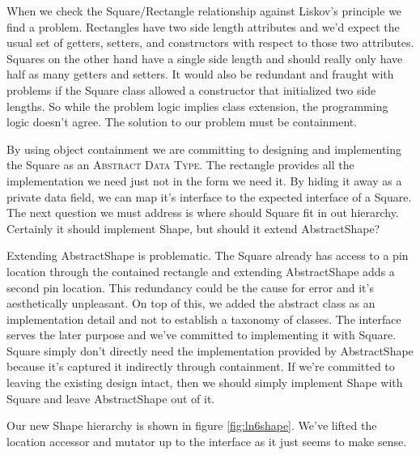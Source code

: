 \documentclass[]{tufte-handout}
\begin{document}
When we check the Square/Rectangle relationship against Liskov's principle we find a problem. Rectangles have two side length attributes and we'd expect the usual set of getters, setters, and constructors with respect to those two attributes. Squares on the other hand have a single side length and should really only have half as many getters and setters. It would also be redundant and fraught with problems if the Square class allowed a constructor that initialized two side lengths. So while the problem logic implies class extension, the programming logic doesn't agree. The solution to our problem must be containment.

By using object containment we are committing to designing and implementing the Square as an \textsc{Abstract Data Type}.  The rectangle provides all the implementation we need just not in the form we need it. By hiding it away as a private data field, we can map it's interface to the expected interface of a Square. The next question we must address is where should Square fit in out hierarchy. Certainly it should implement Shape, but should it extend AbstractShape?

Extending AbstractShape is problematic. The Square already has access to a pin location through the contained rectangle and extending AbstractShape adds a second pin location. This redundancy could be the cause for error and it's aesthetically unpleasant. On top of this, we added the abstract class as an implementation detail and not to establish a taxonomy of classes. The interface serves the later purpose and we've committed to implementing it with Square. Square simply don't directly need the implementation provided by AbstractShape because it's captured it indirectly through containment. If we're committed to leaving the existing design intact, then we should simply implement Shape with Square and leave AbstractShape out of it.


Our new Shape hierarchy is shown in figure \ref{fig:ln6shape}. We've lifted the location accessor and mutator up to the interface as it just seems to make sense.
\end{document}
